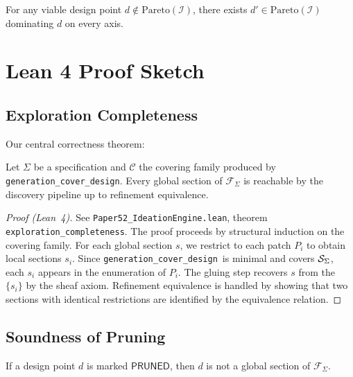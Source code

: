 \documentclass[11pt]{article}
\newcommand{\IdeationSpace}{\mathcal{I}}
\newcommand{\Pruned}{\ensuremath{\mathsf{PRUNED}}}
\newcommand{\GenCover}{\texttt{generation\_cover\_design}}
\begin{document}
\begin{proposition}\label{prop:pareto}
For any viable design point $d \notin \text{Pareto}(\IdeationSpace)$,
there exists $d' \in \text{Pareto}(\IdeationSpace)$ dominating $d$
on every axis.
\end{proposition}

\section{Lean 4 Proof Sketch}\label{sec:lean-proof}

\subsection{Exploration Completeness}
Our central correctness theorem:

\begin{theorem}\label{thm:completeness}
Let $\Sigma$ be a specification and $\mathcal{C}$ the covering family
produced by \GenCover.  Every global section of $\mathcal{F}_\Sigma$
is reachable by the discovery pipeline up to refinement equivalence.
\end{theorem}

\begin{proof}[Proof (Lean~4)]
See \texttt{Paper52\_IdeationEngine.lean}, theorem
\texttt{exploration\_completeness}.  The proof proceeds by structural
induction on the covering family.  For each global section $s$, we
restrict to each patch $P_i$ to obtain local sections $s_i$.  Since
\GenCover\ is minimal and covers $\mathcal{S}_\Sigma$, each $s_i$ appears
in the enumeration of $P_i$.  The gluing step recovers $s$ from the
$\{s_i\}$ by the sheaf axiom.  Refinement equivalence is handled by
showing that two sections with identical restrictions are identified
by the equivalence relation.
\end{proof}

\subsection{Soundness of Pruning}

\begin{lemma}\label{lem:pruning}
If a design point $d$ is marked \Pruned, then $d$ is not a global
section of $\mathcal{F}_\Sigma$.
\end{lemma}
\end{document}
